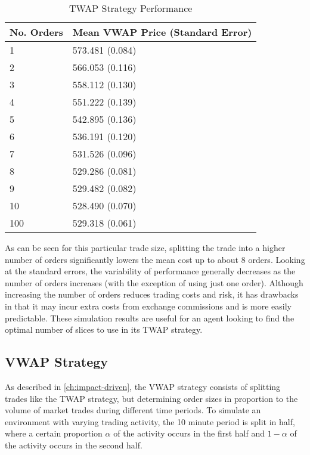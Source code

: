 \begin{table}[htbp]
\begin{center}
\caption{TWAP Strategy Performance} \label{tab:twap_strategy}
\begin{tabular}{l|l}
\hline \hline
\textbf{No. Orders} & \textbf{Mean VWAP Price (Standard Error)} \\
\hline
1                & 573.481 (0.084)            \\
2                & 566.053 (0.116)            \\
3                & 558.112 (0.130)            \\
4                & 551.222 (0.139)            \\
5                & 542.895 (0.136)            \\
6                & 536.191 (0.120)            \\
7                & 531.526 (0.096)            \\
8                & 529.286 (0.081)            \\
9                & 529.482 (0.082)            \\
10               & 528.490 (0.070)            \\
100              & 529.318 (0.061)           
\end{tabular}
\end{center}
\end{table}

As can be seen for this particular trade size, splitting the trade into a higher number of orders significantly lowers the mean cost up to about 8 orders. Looking at the standard errors, the variability of performance generally decreases as the number of orders increases (with the exception of using just one order). Although increasing the number of orders reduces trading costs and risk, it has drawbacks in that it may incur extra costs from exchange commissions and is more easily predictable. These simulation results are useful for an agent looking to find the optimal number of slices to use in its TWAP strategy. 

\subsection{VWAP Strategy}
As described in \ref{ch:impact-driven}, the VWAP strategy consists of splitting trades like the TWAP strategy, but determining order sizes in proportion to the volume of market trades during different time periods. To simulate an environment with varying trading activity, the 10 minute period is split in half, where a certain proportion $\alpha$ of the activity occurs in the first half and $1-\alpha$ of the activity occurs in the second half. 

